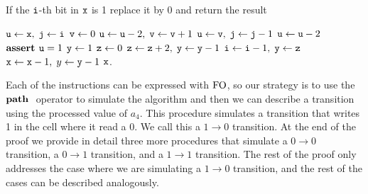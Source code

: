 \begin{algorithm}
	\caption{If the $\mathtt{i}$-th bit in $\mathtt{x}$ is 1 replace it by 0 and return the result}
	\label{switch1to0}
	\begin{algorithmic}
		\State $\mathtt{u} \gets \mathtt{x},\; \mathtt{j} \gets \mathtt{i}$ 
		\State $\mathtt{v} \gets 0$
		\State $\mathtt{u} \gets \mathtt{u}-2,\; \mathtt{v} \gets \mathtt{v}+1$
		\EndWhile
		\State $\mathtt{u}\gets \mathtt{v},\; \mathtt{j} \gets \mathtt{j}-1$
		\EndWhile
		\State $\mathtt{u} \gets \mathtt{u}-2$
		\EndWhile
		\State $\textbf{assert } \mathtt{u} = 1$ 	
		\State $\mathtt{y} \gets 1$ 
		\State $\mathtt{z} \gets 0$
		\State $\mathtt{z} \gets \mathtt{z}+2,\; \mathtt{y} \gets \mathtt{y}-1$
		\EndWhile
		\State $\mathtt{i} \gets \mathtt{i}-1,\; \mathtt{y} \gets \mathtt{z}$
		\EndWhile
		 
		\State $\mathtt{x} \gets \mathtt{x}-1,\; y \gets \mathtt{y}-1$
		\EndWhile
		\State \Return $\mathtt{x}$.
	\end{algorithmic}
\end{algorithm}	
Each of the instructions can be expressed with ${\rm FO}$, so our strategy is to use the ${\bf path} \,\,$ operator to simulate the algorithm and then we can describe a transition using the processed value of $a_4$. This procedure simulates a transition that writes 1 in the cell where it read a 0. We call this a $1 \to 0$ transition. At the end of the proof we provide in detail three more procedures that simulate a $0\to 0$ transition, a $0\to 1$ transition, and a $1\to 1$ transition. The rest of the proof only addresses the case where we are simulating a $1\to 0$ transition, and the rest of the cases can be described analogously.

